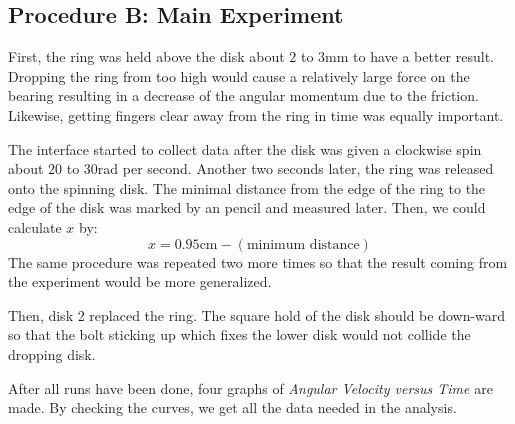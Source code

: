 \subsection{Procedure B: Main Experiment}
First, the ring was held above the disk about $2$ to $3$mm to have a better result. Dropping the ring from too high would cause a relatively large force on the bearing resulting in a decrease of the angular momentum due to the friction. Likewise, getting fingers clear away from the ring in time was equally important.\par
The interface started to collect data after the disk was given a clockwise spin about $2$0 to $30$rad per second. Another two seconds later, the ring was released onto the spinning disk. The minimal distance from the edge of the ring to the edge of the disk was marked by an pencil and measured later. Then, we could calculate $x$ by:
\begin{equation}\label{eq:x}
  x=0.95\text{cm}-(\text{minimum distance})
\end{equation}
The same procedure was repeated two more times so that the result coming from the experiment would be more generalized.\par
Then, disk 2 replaced the ring. The square hold of the disk should be down-ward so that the bolt sticking up which fixes the lower disk would not collide the dropping disk.\par
After all runs have been done, four graphs of \emph{Angular Velocity versus Time} are made. By checking the curves, we get all the data needed in the analysis.



